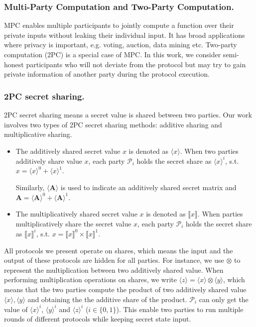 \documentclass[letterpaper]{article} %
\begin{document}
    \subsubsection{Multi-Party Computation and Two-Party Computation.}
    MPC enables multiple participants to jointly compute a function over their private inputs without leaking
	their individual input. It has broad applications where privacy is important, e.g. voting, auction,
	data mining etc. Two-party computation (2PC) is a special case of MPC.
    In this work, we consider semi-honest participants
    who will not deviate from the protocol but may try to gain private information of another party
		during the protocol execution.


        \subsubsection{2PC secret sharing.}
    2PC secret sharing means a secret value is shared between two parties.
    Our work involves two types of 2PC secret sharing methods:
    additive sharing and multiplicative sharing.
    \begin{itemize}
        \item
        The additively shared secret value $x$ is denoted as $\langle x\rangle $.
        When two parties additively share value $x$,
        each party $\mathcal{P}_{i}$ holds the secret share as $\langle x\rangle ^{i}$, s.t.
        $x=\langle x\rangle ^{0}+\langle x\rangle ^{1}$.

        Similarly, $\langle \mathbf{A}\rangle $ is used to indicate an additively shared secret matrix
        and $\mathbf{A} =\langle \mathbf{A}\rangle ^{0}+\langle \mathbf{A}\rangle ^{1}$.

        \item The multiplicatively shared secret value $x$ is denoted as $\llbracket x \rrbracket$.
        When parties multiplicatively share the secret value $x$,
        each party $\mathcal{P}_{i}$ holds the secret share as $\llbracket x \rrbracket ^{i}$, s.t.
        $x=\llbracket x \rrbracket ^{0}\times \llbracket x \rrbracket ^{1}$.

    \end{itemize}


    All protocols we present operate on shares, which means
    the input and the output of these protocols are hidden for all parties.
    For instance, we use $\otimes$ to represent the multiplication between two additively shared value.
    When performing multiplication operations on shares,
    we write $\langle z\rangle=\langle x\rangle\otimes  \langle y\rangle $,
    which means that the two parties compute the product of two additively shared value
    $\langle x\rangle, \langle y\rangle$ and obtaining the
    the additive share of the product.
    $\mathcal{P}_{i}$ can only get the value of $\langle x\rangle ^{i}$, $\langle y\rangle ^{i}$ and $\langle z\rangle ^{i}$ ($i \in \{0,1\}$).
    This enable two parties to run multiple rounds of different protocols while keeping secret state input.
\end{document}
